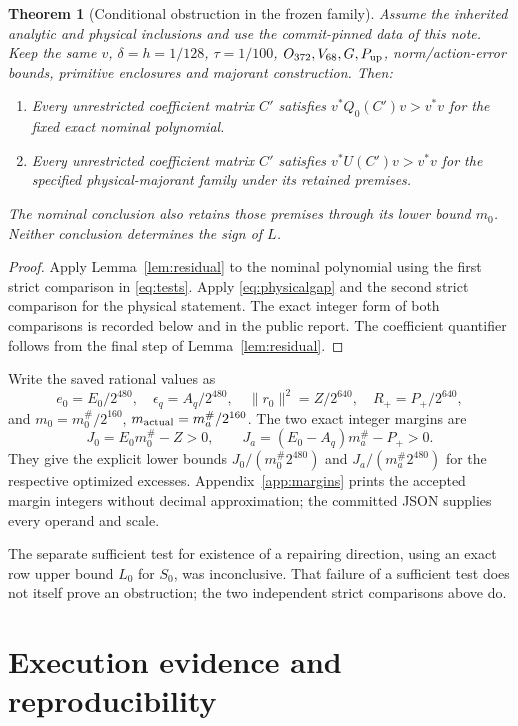 \documentclass[11pt,a4paper]{article}
\newcommand{\norm}[1]{\lVert #1\rVert}
\newtheorem{theorem}{Theorem}[section]
\theoremstyle{definition}
\theoremstyle{remark}
\numberwithin{equation}{section}
\begin{document}
\begin{theorem}[Conditional obstruction in the frozen family]
Assume the inherited analytic and physical inclusions and use the
commit-pinned data of this note. Keep the same $v$, $\delta=h=1/128$,
$\tau=1/100$, $O_{372},V_{68},G,P_{\rm up}$, norm/action-error bounds,
primitive enclosures and majorant construction. Then:
\begin{enumerate}
\item Every unrestricted coefficient matrix $C'$ satisfies
$v^*Q_0(C')v>v^*v$ for the fixed exact nominal polynomial.
\item Every unrestricted coefficient matrix $C'$ satisfies
$v^*U(C')v>v^*v$ for the specified physical-majorant family under its
retained premises.
\end{enumerate}
The nominal conclusion also retains those premises through its lower
bound $m_0$. Neither conclusion determines the sign of $L$.
\end{theorem}
\begin{proof}
Apply Lemma~\ref{lem:residual} to the nominal polynomial using the first
strict comparison in \eqref{eq:tests}. Apply \eqref{eq:physicalgap} and
the second strict comparison for the physical statement. The exact
integer form of both comparisons is recorded below and in the public
report. The coefficient quantifier follows from the final step of
Lemma~\ref{lem:residual}.
\end{proof}

Write the saved rational values as
\[
 e_0=E_0/2^{480},\quad\epsilon_q=A_q/2^{480},\quad
 \norm{r_0}^2=Z/2^{640},\quad R_+=P_+/2^{640},
\]
and $m_0=m_0^{\#}/2^{160}$,
$m_{\rm actual}=m_a^{\#}/2^{160}$. The two exact integer margins are
\begin{equation}\label{eq:integermargins}
 J_0=E_0m_0^{\#}-Z>0,\qquad
 J_a=(E_0-A_q)m_a^{\#}-P_+>0.
\end{equation}
They give the explicit lower bounds
$J_0/(m_0^{\#}2^{480})$ and $J_a/(m_a^{\#}2^{480})$ for the respective
optimized excesses. Appendix~\ref{app:margins} prints the accepted margin
integers without decimal approximation; the committed JSON supplies
every operand and scale.

The separate sufficient test for existence of a repairing direction,
using an exact row upper bound $L_0$ for $S_0$, was inconclusive.
That failure of a sufficient test does not itself prove an obstruction;
the two independent strict comparisons above do.

\section{Execution evidence and reproducibility}
\end{document}

